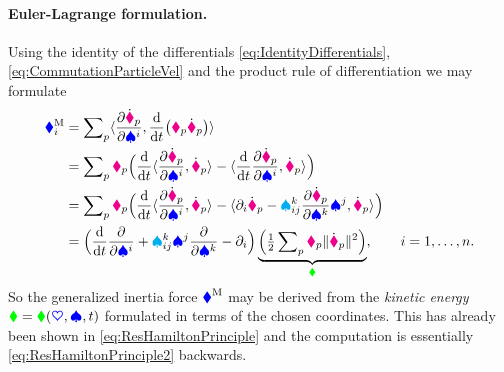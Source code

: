 \paragraph{Euler-Lagrange formulation.}
Using the identity of the differentials \eqref{eq:IdentityDifferentials}, \eqref{eq:CommutationParticleVel} and the product rule of differentiation we may formulate
\begin{align}
 \genForceInertiaCoeff{\LidxI}
 &= \sumParticles \sProd{\pdiff[\particlePosd{\PidxI}]{\sysVelCoeff{\LidxI}}}{\diff{t}\big(\particleMass{\PidxI} \particlePosd{\PidxI}\big)}
\nonumber\\
 &= \sumParticles \particleMass{\PidxI}  \Big( \diff{t} \sProd{\pdiff[\particlePosd{\PidxI}]{\sysVelCoeff{\LidxI}}}{\particlePosd{\PidxI}} - \sProd{\diff{t} \pdiff[\particlePosd{\PidxI}]{\sysVelCoeff{\LidxI}}}{\particlePosd{\PidxI}}\Big)
\nonumber\\
 &= \sumParticles \particleMass{\PidxI}  \Big( \diff{t} \sProd{\pdiff[\particlePosd{\PidxI}]{\sysVelCoeff{\LidxI}}}{\particlePosd{\PidxI}} - \sProd{\dirDiff{\LidxI} \particlePosd{\PidxI} - \BoltzSym{\LidxIII}{\LidxI}{\LidxII} \pdiff[\particlePosd{\PidxI}]{\sysVelCoeff{\LidxIII}} \sysVelCoeff{\LidxII}}{\particlePosd{\PidxI}}\Big)
\nonumber\\
 &= \Big(\diff{t} \pdiff{\sysVelCoeff{\LidxI}} + \BoltzSym{\LidxIII}{\LidxI}{\LidxII} \sysVelCoeff{\LidxII} \pdiff{\sysVelCoeff{\LidxIII}} - \dirDiff{\LidxI} \Big)
 \underbrace{\Big( \tfrac{1}{2} \sumParticles \particleMass{\PidxI} \norm{\particlePosd{\PidxI}}^2 \Big)}_{\kineticEnergy},
 \qquad
 \LidxI = 1,\ldots,\dimConfigSpace.
\label{eq:InertiaForceKinEnergy}
\end{align}
So the generalized inertia force $\boldsymbol{\textcolor{blue}{\blacklozenge}}^{\mathrm{M}}$ may be derived from the \textit{kinetic energy} $\textcolor{green}{\blacklozenge} = \textcolor{green}{\blacklozenge}(\boldsymbol{\textcolor{blue}{\heartsuit}}, \boldsymbol{\textcolor{blue}{\spadesuit}}, t)$ formulated in terms of the chosen coordinates.
This has already been shown in \eqref{eq:ResHamiltonPrinciple} and the computation is essentially \eqref{eq:ResHamiltonPrinciple2} backwards.

